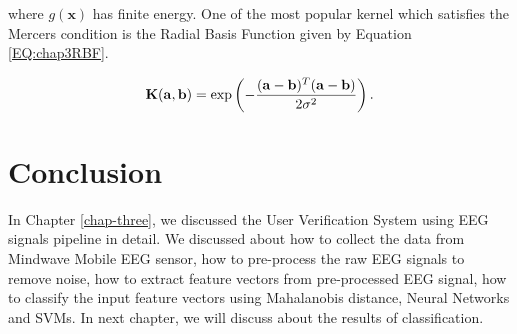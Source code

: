     \noindent where $g(\mathbf{x})$ has finite energy. One of the most popular kernel which satisfies the Mercers condition is the Radial Basis Function given by Equation \ref{EQ:chap3RBF}.
    
    \begin{equation}
    	\mathbf{K}(\mathbf{a}, \mathbf{b}) = \textmd{exp}\left( - \frac{(\mathbf{a} - \mathbf{b})^T (\mathbf{a} - \mathbf{b})}{2\sigma^2}\right).
    	\label{EQ:chap3RBF}
    \end{equation}
    
    
    \section{Conclusion}
    
    In Chapter \ref{chap-three}, we discussed the User Verification System using EEG signals pipeline in detail. We discussed about how to collect the data from Mindwave Mobile EEG sensor, how to pre-process the raw EEG signals to remove noise, how to extract feature vectors from pre-processed EEG signal, how to classify the input feature vectors using Mahalanobis distance, Neural Networks and SVMs. In next chapter, we will discuss about the results of classification.
    
    
    
    
    
    
    
    
    
    
    
    
    
    
    
    
    
